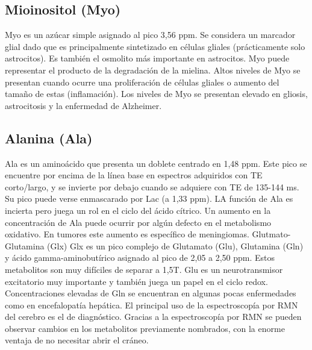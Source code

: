 \subsection{Mioinositol (Myo)}
Myo es un azúcar simple asignado al pico 3,56 ppm. Se considera un marcador glial dado que es principalmente sintetizado en células gliales (prácticamente solo astrocitos). Es también el osmolito más importante en astrocitos. Myo puede representar el producto de la degradación de la mielina. Altos niveles de Myo se presentan cuando ocurre una proliferación de células gliales o aumento del tamaño de estas (inflamación). Los niveles de Myo se presentan elevado en gliosis, astrocitosis y la enfermedad de Alzheimer.

\subsection{Alanina (Ala)}
Ala es un aminoácido que presenta un doblete centrado en 1,48 ppm. Este pico se encuentre por encima de la línea base en espectros adquiridos con TE corto/largo, y se invierte por debajo cuando se adquiere con TE de 135-144 ms. Su pico puede verse enmascarado por Lac (a 1,33 ppm). LA función de Ala es incierta pero juega un rol en el ciclo del ácido cítrico. Un aumento en la concentración de Ala puede ocurrir por algún defecto en el metabolismo oxidativo. En tumores este aumento es específico de meningiomas.
Glutmato-Glutamina (Glx)
Glx es un pico complejo de Glutamato (Glu), Glutamina (Gln) y ácido gamma-aminobutírico asignado al pico de 2,05 a 2,50 ppm. Estos metabolitos son muy difíciles de separar a 1,5T. Glu es un neurotransmisor excitatorio muy importante y también juega un papel en el ciclo redox. Concentraciones elevadas de Gln se encuentran en algunas pocas enfermedades como en encefalopatía hepática.
El principal uso de la espectroscopía por RMN del cerebro es el de diagnóstico. Gracias a la espectroscopía por RMN se pueden observar cambios en los metabolitos previamente nombrados, con la enorme ventaja de no necesitar abrir el cráneo.



